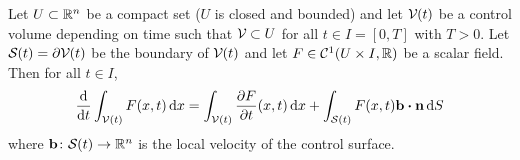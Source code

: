 \begin{theorem}
	Let $U \subset \mathbb{R}^n$ be a compact set (\ie $U$ is closed and bounded) and
	let $\mathcal{V}_{}(t)$ be a control volume depending on time such that $\mathcal{V}_{}
	\subset U$ for all $t \in I = [0, T]$ with $T > 0$. Let $\mathcal{S}_{}(t) = \partial
	\mathcal{V}_{}(t)$ be the boundary of $\mathcal{V}_{}(t)$ and let $F \in \mathcal{C}^1(U
	\times I, \mathbb{R})$ be a scalar field. Then for all $t \in I$,
	\begin{equation} \label{eq:reynolds_transport_theorem}
		\frac{\dd}{\dd{t}} \int_\cvt F(x, t) \dd{x} = 
		\int_\cvt \frac{\partial F}{\partial t} (x, t) \dd{x} + 
		\int_\cst F(x, t) \vb{b} \vdot \vb{n} \dd{S}
	\end{equation}
	where $\vb{b} \colon \mathcal{S}_{}(t) \rightarrow \mathbb{R}^n$ is the local velocity of
	the control surface.
\end{theorem}
